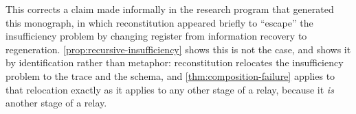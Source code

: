 This corrects a claim made informally in the research program that
generated this monograph, in which reconstitution appeared briefly to
``escape'' the insufficiency problem by changing register from
information recovery to regeneration. \cref{prop:recursive-insufficiency}
shows this is not the case, and shows it by identification rather than
metaphor: reconstitution relocates the insufficiency problem to the trace
and the schema, and \cref{thm:composition-failure} applies to that
relocation exactly as it applies to any other stage of a relay, because
it \emph{is} another stage of a relay.
